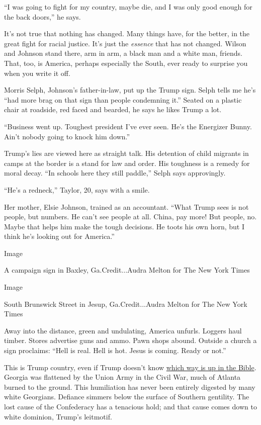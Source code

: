 ``I was going to fight for my country, maybe die, and I was only good
enough for the back doors,'' he says.

It's not true that nothing has changed. Many things have, for the
better, in the great fight for racial justice. It's just the
\emph{essence} that has not changed. Wilson and Johnson stand there, arm
in arm, a black man and a white man, friends. That, too, is America,
perhaps especially the South, ever ready to surprise you when you write
it off.

Morris Selph, Johnson's father-in-law, put up the Trump sign. Selph
tells me he's ``had more brag on that sign than people condemning it.''
Seated on a plastic chair at roadside, red faced and bearded, he says he
likes Trump a lot.

``Business went up. Toughest president I've ever seen. He's the
Energizer Bunny. Ain't nobody going to knock him down.''

Trump's lies are viewed here as straight talk. His detention of child
migrants in camps at the border is a stand for law and order. His
toughness is a remedy for moral decay. ``In schools here they still
paddle,'' Selph says approvingly.

``He's a redneck,'' Taylor, 20, says with a smile.

Her mother, Elsie Johnson, trained as an accountant. ``What Trump sees
is not people, but numbers. He can't see people at all. China, pay more!
But people, no. Maybe that helps him make the tough decisions. He toots
his own horn, but I think he's looking out for America.''

Image

A campaign sign in Baxley, Ga.Credit...Audra Melton for The New York
Times

Image

South Brunswick Street in Jesup, Ga.Credit...Audra Melton for The New
York Times

Away into the distance, green and undulating, America unfurls. Loggers
haul timber. Stores advertise guns and ammo. Pawn shops abound. Outside
a church a sign proclaims: ``Hell is real. Hell is hot. Jesus is coming.
Ready or not.''

This is Trump country, even if Trump doesn't know
\href{https://www.facebookcorewwwi.onion/watch/?v=10153577166571880}{which
way is up in the Bible}. Georgia was flattened by the Union Army in the
Civil War, much of Atlanta burned to the ground. This humiliation has
never been entirely digested by many white Georgians. Defiance simmers
below the surface of Southern gentility. The lost cause of the
Confederacy has a tenacious hold; and that cause comes down to white
dominion, Trump's leitmotif.

